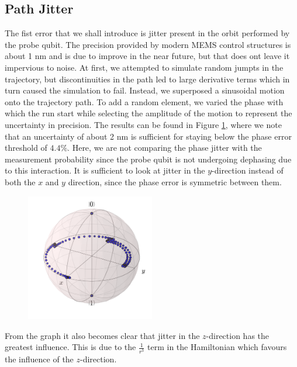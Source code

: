 \subsection{Path Jitter}
The fist error that we shall introduce is jitter present in the orbit performed by the probe qubit. The precision provided by modern MEMS control structures is about 1 nm \cite{MEMS precision} and is due to improve in the near future, but that does ont leave it impervious to noise. At first, we attempted to simulate random jumpts in the trajectory, but discontinuities in the path led to large derivative terms which in turn caused the simulation to fail. Instead, we superposed a sinusoidal motion onto the trajectory path. To add a random element, we varied the phase with which the run start while selecting the amplitude of the motion to represent the uncertainty in precision. The results can be found in Figure \ref{fig:pathjitter}, where we note that an uncertainty of about 2 nm is sufficient for staying below the phase error threshold of $4.4 \%$. Here, we are not comparing the phase jitter with the measurement probability since the probe qubit is not undergoing dephasing due to this interaction. It is sufficient to look at jitter in the $y$-direction instead of both the $x$ and $y$ direction, since the phase error is symmetric between them. 



\begin{figure}[h]
  \centering
    \includegraphics[width=0.5\textwidth]{../Figures/Circ_orbit_odd_100_dephasing.png}
      \caption{ }
      \label{fig:pathjitter}
\end{figure}


From the graph it also becomes clear that jitter in the $z$-direction has the greatest influence. This is due to the $\frac{1}{r^3}$  term in the Hamiltonian which favours the influence of the $z$-direction. 





